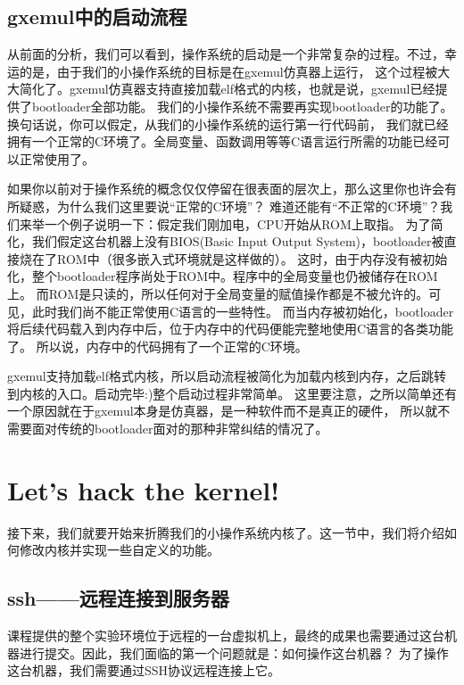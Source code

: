 \subsection{gxemul中的启动流程}
从前面的分析，我们可以看到，操作系统的启动是一个非常复杂的过程。不过，幸运的是，由于我们的小操作系统的目标是在gxemul仿真器上运行，
这个过程被大大简化了。gxemul仿真器支持直接加载elf格式的内核，也就是说，gxemul已经提供了bootloader全部功能。
我们的小操作系统不需要再实现bootloader的功能了。换句话说，你可以假定，从我们的小操作系统的运行第一行代码前，
我们就已经拥有一个正常的C环境了。全局变量、函数调用等等C语言运行所需的功能已经可以正常使用了。

\begin{note}
如果你以前对于操作系统的概念仅仅停留在很表面的层次上，那么这里你也许会有所疑惑，为什么我们这里要说“正常的C环境”？
难道还能有“不正常的C环境”？我们来举一个例子说明一下：假定我们刚加电，CPU开始从ROM上取指。
为了简化，我们假定这台机器上没有BIOS(Basic Input Output System)，bootloader被直接烧在了ROM中（很多嵌入式环境就是这样做的）。
这时，由于内存没有被初始化，整个bootloader程序尚处于ROM中。程序中的全局变量也仍被储存在ROM上。
而ROM是只读的，所以任何对于全局变量的赋值操作都是不被允许的。可见，此时我们尚不能正常使用C语言的一些特性。
而当内存被初始化，bootloader将后续代码载入到内存中后，位于内存中的代码便能完整地使用C语言的各类功能了。
所以说，内存中的代码拥有了一个正常的C环境。
\end{note}

gxemul支持加载elf格式内核，所以启动流程被简化为加载内核到内存，之后跳转到内核的入口。启动完毕:)整个启动过程非常简单。
这里要注意，之所以简单还有一个原因就在于gxemul本身是仿真器，是一种软件而不是真正的硬件，
所以就不需要面对传统的bootloader面对的那种非常纠结的情况了。

\section{Let's hack the kernel!}

接下来，我们就要开始来折腾我们的小操作系统内核了。这一节中，我们将介绍如何修改内核并实现一些自定义的功能。

\subsection{ssh——远程连接到服务器}
课程提供的整个实验环境位于远程的一台虚拟机上，最终的成果也需要通过这台机器进行提交。因此，我们面临的第一个问题就是：如何操作这台机器？
为了操作这台机器，我们需要通过SSH协议远程连接上它。

